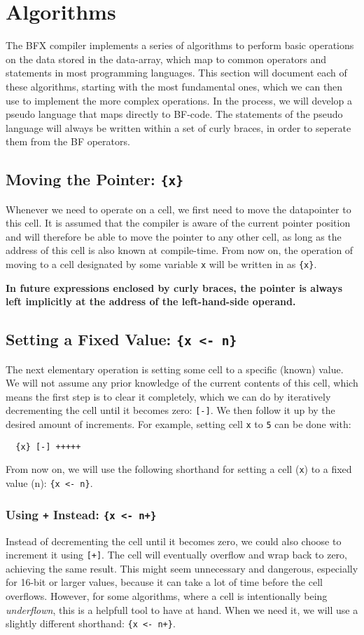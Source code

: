 \section{Algorithms}
The BFX compiler implements a series of algorithms to perform basic operations on the data stored in the data-array, which map to common operators and statements in most programming languages. This section will document each of these algorithms, starting with the most fundamental ones, which we can then use to implement the more complex operations. In the process, we will develop a pseudo language that maps directly to BF-code. The statements of the pseudo language will always be written within a set of curly braces, in order to seperate them from the BF operators.

\subsection{Moving the Pointer: \texttt{\{x\}}}
Whenever we need to operate on a cell, we first need to move the datapointer to this cell. It is assumed that the compiler is aware of the current pointer position and will therefore be able to move the pointer to any other cell, as long as the address of this cell is also known at compile-time. From now on, the operation of moving to a cell designated by some variable \texttt{x} will be written in as \texttt{\{x\}}.

\textbf{In future expressions enclosed by curly braces, the pointer is always left implicitly at the address of the left-hand-side operand.}

\subsection{Setting a Fixed Value: \texttt{\{x <- n\}}}
The next elementary operation is setting some cell to a specific (known) value. We will not assume any prior knowledge of the current contents of this cell, which means the first step is to clear it completely, which we can do by iteratively decrementing the cell until it becomes zero: \texttt{[-]}. We then follow it up by the desired amount of increments. For example, setting cell \texttt{x} to \texttt{5} can be done with:
\begin{lstlisting}
  {x} [-] +++++
\end{lstlisting}
From now on, we will use the following shorthand for setting a cell (\texttt{x}) to a fixed value (n): \texttt{\{x <- n\}}.
\subsubsection{Using \texttt{+} Instead: \texttt{\{x <- n+\}}}
Instead of decrementing the cell until it becomes zero, we could also choose to increment it using \texttt{[+]}. The cell will eventually overflow and wrap back to zero, achieving the same result. This might seem unnecessary and dangerous, especially for 16-bit or larger values, because it can take a lot of time before the cell overflows. However, for some algorithms, where a cell is intentionally being \emph{underflown}, this is a helpfull tool to have at hand. When we need it, we will use a slightly different shorthand: \texttt{\{x <- n+\}}.

